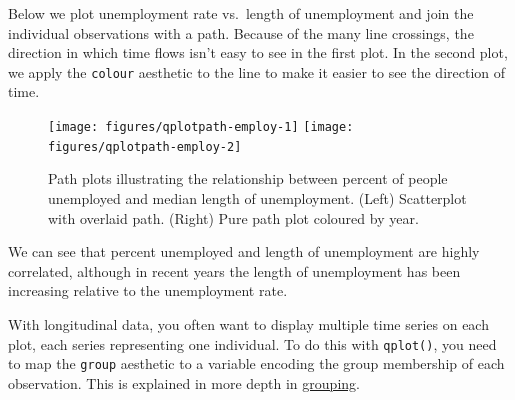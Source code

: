 Below we plot unemployment rate vs.~length of unemployment and join the
individual observations with a path. Because of the many line crossings,
the direction in which time flows isn't easy to see in the first plot.
In the second plot, we apply the \texttt{colour} aesthetic to the line
to make it easier to see the direction of time.

\begin{Shaded}
\begin{Highlighting}[]
\StringTok{ }\StringTok{ }
\StringTok{ } 
    \NormalTok{(}\NormalTok{, }\NormalTok{))}
\StringTok{ } 
   \NormalTok{, } 
\end{Highlighting}
\end{Shaded}

\begin{figure}
\texttt{[image: figures/qplotpath-employ-1]} \texttt{[image: figures/qplotpath-employ-2]} \caption{Path plots illustrating the relationship between percent of people unemployed and median length of unemployment.  (Left) Scatterplot with overlaid path.  (Right) Pure path plot coloured by year.\label{fig:path-employ}}
\end{figure}

We can see that percent unemployed and length of unemployment are highly
correlated, although in recent years the length of unemployment has been
increasing relative to the unemployment rate.

With longitudinal data, you often want to display multiple time series
on each plot, each series representing one individual. To do this with
\texttt{qplot()}, you need to map the \texttt{group} aesthetic to a
variable encoding the group membership of each observation. This is
explained in more depth in \hyperref[sub:grouping]{grouping}.
 


